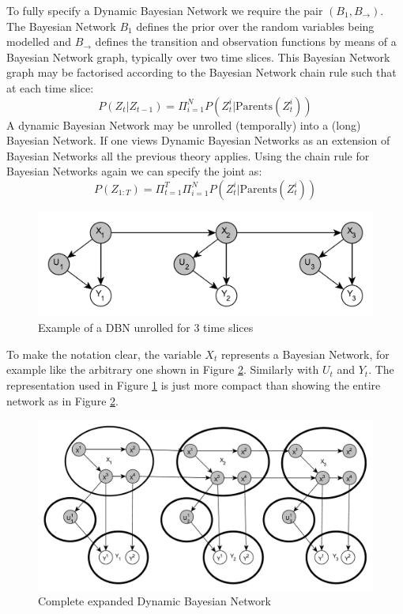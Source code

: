 \documentclass[../masters.tex]{subfiles}
\begin{document}
To fully specify a Dynamic Bayesian Network we require the pair $(B_1, B_{\rightarrow})$. The Bayesian Network $B_1$ defines the prior over the random variables being modelled and $B_{\rightarrow}$ defines the transition and observation functions by means of a Bayesian Network graph, typically over two time slices. This Bayesian Network graph may be factorised according to the Bayesian Network chain rule such that at each time slice:
\begin{equation}
P(Z_t|Z_{t-1}) = \Pi_{i=1}^{N}P(Z_t^i| \text{Parents} (Z^i_t))
\end{equation}
A dynamic Bayesian Network may be unrolled (temporally) into a (long) Bayesian Network. If one views Dynamic Bayesian Networks as an extension of Bayesian Networks all the previous theory applies. Using the chain rule for Bayesian Networks again we can specify the joint as:
\begin{equation}
P(Z_{1:T}) = \Pi_{t=1}^{T}\Pi_{i=1}^{N}P(Z_t^i| \text{Parents} (Z^i_t))
\end{equation}
\begin{figure}[H] 
\centering
\includegraphics[scale=0.8]{general_dbn.pdf}
\caption{Example of a DBN unrolled for 3 time slices}
\label{fig_gen_dbn}
\end{figure}
To make the notation clear, the variable $X_t$ represents a Bayesian Network, for example like the arbitrary one shown in Figure \ref{fig_spec_dbn}. Similarly with $U_t$ and $Y_t$. The representation used in Figure \ref{fig_gen_dbn} is just more compact than showing the entire network as in Figure \ref{fig_spec_dbn}.
\begin{figure}[H] 
\centering
\includegraphics[scale=0.4]{spec_dbn.pdf}
\caption{Complete expanded Dynamic Bayesian Network}
\label{fig_spec_dbn}
\end{figure}
\end{document}
